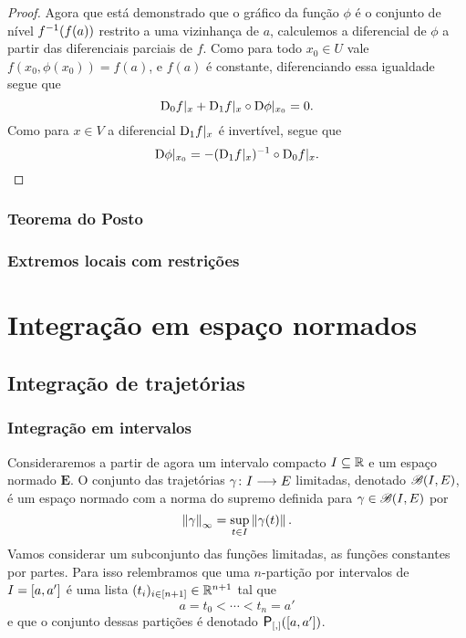 \begin{proof}
Agora que está demonstrado que o gráfico da função $\phi$ é o conjunto de nível $f^{-1}(f(a))$ restrito a uma vizinhança de $a$, calculemos a diferencial de $\phi$ a partir das diferenciais parciais de $f$. Como para todo $x_0 \in U$ vale $f(x_0,\phi(x_0)) = f(a)$, e $f(a)$ é constante, diferenciando essa igualdade segue que
	\begin{equation*}
	\mathrm{D}_0 f|_x + \mathrm{D}_1 f|_x \circ \mathrm{D} \phi|_{x_0} = 0.
	\end{equation*}
Como para $x \in V$ a diferencial $\mathrm{D}_1 f|_x$ é invertível, segue que
	\begin{equation*}
	\mathrm{D} \phi|_{x_0} = - (\mathrm{D}_1 f|_x)^{-1} \circ \mathrm{D}_0 f|_x.
	\qedhere
	\end{equation*}
\end{proof}





\subsubsection{Teorema do Posto}





\subsubsection{Extremos locais com restrições}





\section{Integração em espaço normados}

\subsection{Integração de trajetórias}

\subsubsection{Integração em intervalos}

Consideraremos a partir de agora um intervalo compacto $I \subseteq \mathbb{R}$ e um espaço normado $\bm E$. O conjunto das trajetórias $\gamma\colon \allowbreak I \longrightarrow E$ limitadas, denotado $\mathscr{B}(I,E)$, é um espaço normado com a norma do supremo definida para $\gamma \in \mathscr{B}(I,E)$ por
	\begin{equation*}
	\left\Vert{\gamma}\right\Vert_{\infty} = \sup_{t \in I} \left\Vert{\gamma(t)}\right\Vert.
	\end{equation*}
Vamos considerar um subconjunto das funções limitadas, as funções constantes por partes. Para isso relembramos que uma $n$-partição por intervalos de $I = \left[a,\allowbreak a'\right]$ é uma lista $(t_i)_{i \in [n+1]} \in \mathbb{R}^{n+1}$ tal que
	\begin{equation*}
	a = t_0 < \cdots < t_n = a'
	\end{equation*}
e que o conjunto dessas partições é denotado $\Partinter(\intff{a}{a'})$.

